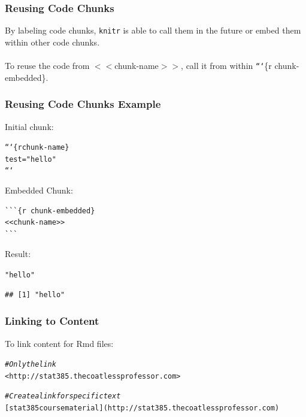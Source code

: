 \documentclass{beamer}\usepackage[]{graphicx}\usepackage[]{color}
\makeatletter
\newcommand{\hlstr}[1]{\textcolor[rgb]{0.192,0.494,0.8}{#1}}%
\newcommand{\hlcom}[1]{\textcolor[rgb]{0.678,0.584,0.686}{\textit{#1}}}%
\newenvironment{kframe}{%
 \def\at@end@of@kframe{}%
 \ifinner\ifhmode%
  \def\at@end@of@kframe{\end{minipage}}%
  \begin{minipage}{\columnwidth}%
 \fi\fi%
 \def\FrameCommand##1{\hskip\@totalleftmargin \hskip-\fboxsep
 \colorbox{shadecolor}{##1}\hskip-\fboxsep
     \hskip-\linewidth \hskip-\@totalleftmargin \hskip\columnwidth}%
 \MakeFramed {\advance\hsize-\width
   \@totalleftmargin\z@ \linewidth\hsize
   \@setminipage}}%
 {\par\unskip\endMakeFramed%
 \at@end@of@kframe}
\newenvironment{knitrout}{}{} %
\makeatother
\begin{document}
\begin{frame}
\frametitle{Reusing Code Chunks}
By labeling code chunks, \texttt{knitr} is able to call them in the future or embed them within other code chunks.
\\$ $\\
To reuse the code from $<<$chunk-name$>>$, call it from within \texttt{```}\{r chunk-embedded\}.
\end{frame}

\begin{frame}[fragile]
\frametitle{Reusing Code Chunks Example}
Initial chunk:
\begin{knitrout}\footnotesize
{}\color{fgcolor}\begin{kframe}
\begin{alltt}
```\{r chunk-name\}
test = \hlstr{"hello"}
```
\end{alltt}
\end{kframe}
\end{knitrout}

Embedded Chunk:
\begin{knitrout}\footnotesize
{}\color{fgcolor}\begin{kframe}
\begin{verbatim}
```{r chunk-embedded}
<<chunk-name>>
```
\end{verbatim}
\end{kframe}
\end{knitrout}

Result:
\begin{knitrout}\footnotesize
{}\color{fgcolor}\begin{kframe}
\begin{alltt}
\hlstr{"hello"}
\end{alltt}
\begin{verbatim}
## [1] "hello"
\end{verbatim}
\end{kframe}
\end{knitrout}
\end{frame}


\begin{frame}[fragile]
\frametitle{Linking to Content}
To link content for Rmd files:
\begin{knitrout}
\color{fgcolor}\begin{kframe}
\begin{alltt}
\hlcom{# Only the link}
<http://stat385.thecoatlessprofessor.com>
  
\hlcom{# Create a link for specific text}
[stat385 course material](http://stat385.thecoatlessprofessor.com) 
\end{alltt}
\end{kframe}
\end{knitrout}
\end{frame}
\end{document}
